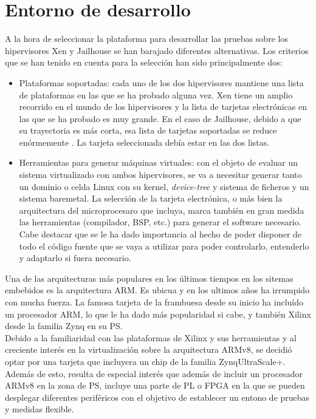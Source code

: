 \chapter{Entorno de desarrollo}

A la hora de seleccionar la plataforma para desarrollar las pruebas sobre los hipervisores Xen y Jailhouse se han barajado diferentes alternativas. Los criterios que se han tenido en cuenta para la selección han sido principalmente dos:
\begin{itemize}
  \item Plataformas soportadas: cada uno de los dos hipervisores mantiene una lista de plataformas en las que se ha probado alguna vez. Xen tiene un amplio recorrido en el mundo de los hipervisores y la lista de tarjetas electrónicas en las que se ha probado es muy grande. En el caso de Jailhouse, debido a que su trayectoria es más corta, esa lista de tarjetas soportadas se reduce enórmemente \cite{jailhouse_github}. La tarjeta seleccionada debía estar en las dos listas.
  \item Herramientas para generar máquinas virtuales: con el objeto de evaluar un sistema virtualizado con ambos hipervisores, se va a necesitar generar tanto un dominio o celda Linux con su kernel, \textit{device-tree} y sistema de ficheros y un sistema baremetal. La selección de la tarjeta electrónica, o más bien la arquitectura del microprocesaro que incluya, marca también en gran medida las herramientas (compilador, BSP, etc.) para generar el software necesario. Cabe destacar que se le ha dado importancia al hecho de poder disponer de todo el código fuente que se vaya a utilizar para poder controlarlo, entenderlo y adaptarlo si fuera necesario.
\end{itemize}

Una de las arquitecturas más populares en los últimos tiempos en los sitemas embebidos es la arquitectura ARM. Es ubicua y en los ultimos años ha irrumpido con mucha fuerza. La famosa tarjeta de la frambuesa desde su inicio ha incluído un procesador ARM, lo que le ha dado más popularidad si cabe, y también Xilinx desde la familia Zynq en su PS.\\
Debido a la familiaridad con las plataformas de Xilinx y sus herramientas y al creciente interés en la virtualización sobre la arquitectura ARMv8, se decidió optar por una tarjeta que incluyera un chip de la familia Zynq\textregistered UltraScale+\texttrademark. Además de esto, resulta de especial interés que además de incluir un procesador ARMv8 en la zona de PS, incluye una parte de PL o FPGA en la que se pueden desplegar diferentes periféricos con el objetivo de establecer un entono de pruebas y medidas flexible.

